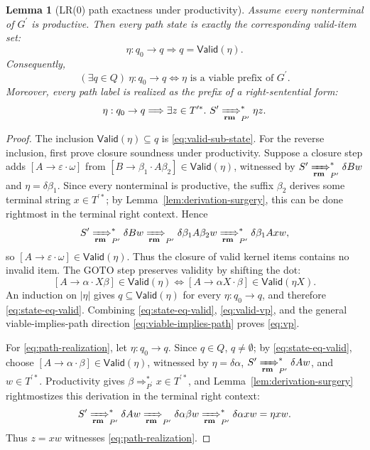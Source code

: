 \documentclass[11pt,a4paper]{article}
\theoremstyle{prettyplain}
\newtheorem{lemma}[theorem]{Lemma}
\theoremstyle{prettydef}
\newcommand{\eps}{\varepsilon}
\newcommand{\RMP}{\xRightarrow[\mathbf{rm}]{}_{P^\prime}}
\newcommand{\Path}[3]{#1:#2\to#3}
\newcommand{\Item}[2]{[#1\to #2]}
\begin{document}
\begin{lemma}[LR(0) path exactness under productivity]
\label{lem:lra-path-exact-productive}
Assume every nonterminal of \(G^\prime\) is productive.  Then every path state is
exactly the corresponding valid-item set:
\begin{equation}\label{eq:state-eq-valid}
\Path{\eta}{q_0}{q}
\Longrightarrow
q=\mathsf{Valid}(\eta).
\end{equation}
Consequently,
\begin{equation}\label{eq:vp}
(\exists q\in Q)\ \Path{\eta}{q_0}{q}
\Longleftrightarrow
\eta\text{ is a viable prefix of }G^\prime .
\end{equation}
Moreover, every path label is realized as the prefix of a right-sentential form:
\begin{equation}\label{eq:path-realization}
\Path{\eta}{q_0}{q}
\Longrightarrow
\exists z\in T^{\prime *}.\ S^\prime\RMP^*\eta z .
\end{equation}
\end{lemma}

\begin{proof}
The inclusion \(\mathsf{Valid}(\eta)\subseteq q\) is
\eqref{eq:valid-sub-state}.  For the reverse inclusion, first prove closure
soundness under productivity.  Suppose a closure step adds
\(\Item{A}{\eps\cdot\omega}\) from
\(\Item{B}{\beta_1\cdot A\beta_2}\in\mathsf{Valid}(\eta)\), witnessed by
\(S^\prime\RMP^*\delta B w\) and \(\eta=\delta\beta_1\).  Since every nonterminal is
productive, the suffix \(\beta_2\) derives some terminal string \(x\in T^{\prime *}\);
by Lemma~\ref{lem:derivation-surgery}, this can be done rightmost in the terminal
right context.  Hence
\[
S^\prime\RMP^*\delta B w
\RMP
\delta\beta_1A\beta_2w
\RMP^*
\delta\beta_1A xw,
\]
so \(\Item{A}{\eps\cdot\omega}\in\mathsf{Valid}(\eta)\).  Thus the closure of
valid kernel items contains no invalid item.  The \(\mathrm{GOTO}\) step preserves
validity by shifting the dot:
\[
\Item{A}{\alpha\cdot X\beta}\in\mathsf{Valid}(\eta)
\Longleftrightarrow
\Item{A}{\alpha X\cdot\beta}\in\mathsf{Valid}(\eta X).
\]
An induction on \(|\eta|\) gives \(q\subseteq\mathsf{Valid}(\eta)\) for every
\(\Path{\eta}{q_0}{q}\), and therefore \eqref{eq:state-eq-valid}.
Combining \eqref{eq:state-eq-valid}, \eqref{eq:valid-vp}, and the general
viable-implies-path direction \eqref{eq:viable-implies-path} proves
\eqref{eq:vp}.

For \eqref{eq:path-realization}, let \(\Path{\eta}{q_0}{q}\).  Since \(q\in Q\),
\(q\ne\emptyset\); by \eqref{eq:state-eq-valid}, choose
\(\Item{A}{\alpha\cdot\beta}\in\mathsf{Valid}(\eta)\), witnessed by
\(\eta=\delta\alpha\), \(S^\prime\RMP^*\delta A w\), and \(w\in T^{\prime *}\).
Productivity gives \(\beta\Rightarrow_{P^\prime}^*x\in T^{\prime *}\), and
Lemma~\ref{lem:derivation-surgery} rightmostizes this derivation in the terminal
right context:
\[
S^\prime\RMP^*\delta A w
\RMP
\delta\alpha\beta w
\RMP^*
\delta\alpha xw
=
\eta xw .
\]
Thus \(z=xw\) witnesses \eqref{eq:path-realization}.
\end{proof}
\end{document}
